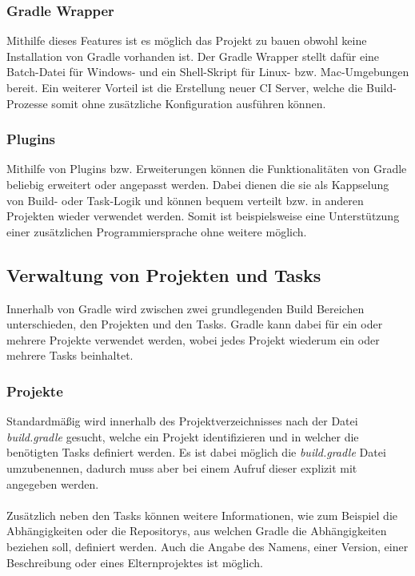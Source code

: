 \subsubsection{Gradle Wrapper}
Mithilfe dieses Features ist es möglich das Projekt zu bauen obwohl keine Installation von Gradle vorhanden ist. Der Gradle Wrapper stellt dafür eine Batch-Datei für Windows- und ein Shell-Skript für Linux- bzw. Mac-Umgebungen bereit. Ein weiterer Vorteil ist die Erstellung neuer \gls{CI} Server, welche die Build-Prozesse somit ohne zusätzliche Konfiguration ausführen können.

\subsubsection{Plugins}
Mithilfe von Plugins bzw. Erweiterungen können die Funktionalitäten von Gradle beliebig erweitert oder angepasst werden. Dabei dienen die sie als Kappselung von Build- oder Task-Logik und können bequem verteilt bzw. in anderen Projekten wieder verwendet werden. Somit ist beispielsweise eine Unterstützung einer zusätzlichen Programmiersprache ohne weitere möglich.

\subsection{Verwaltung von Projekten und Tasks}
Innerhalb von Gradle  wird zwischen zwei grundlegenden Build Bereichen unterschieden, den Projekten und den Tasks. Gradle kann dabei für ein oder mehrere Projekte verwendet werden, wobei jedes Projekt wiederum ein oder mehrere Tasks beinhaltet.

\subsubsection{Projekte}
Standardmäßig wird innerhalb des Projektverzeichnisses nach der Datei \textit{build.gradle} gesucht, welche ein Projekt identifizieren und in welcher die benötigten Tasks definiert werden. Es ist dabei möglich die \textit{build.gradle} Datei umzubenennen, dadurch muss aber bei einem Aufruf dieser explizit mit angegeben werden.\\
\\
Zusätzlich neben den Tasks können weitere Informationen, wie zum Beispiel die Abhängigkeiten oder die Repositorys, aus welchen Gradle die Abhängigkeiten beziehen soll, definiert werden. Auch die Angabe des Namens, einer Version, einer Beschreibung oder eines Elternprojektes ist möglich.

